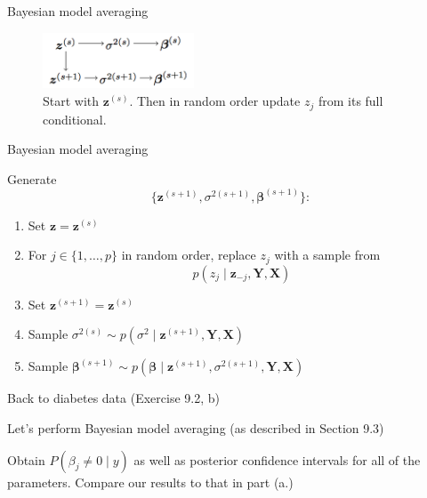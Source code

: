 \documentclass[ignorenonframetext,]{beamer}
\newcommand{\bz}   {\bm{z}}
\newcommand{\bY}   {\bm{Y}}
\newcommand{\bbeta}{\bm{\beta}}
\newcommand{\bX}   {\bm{X}}
\begin{document}

\begin{frame}{Bayesian model averaging}

\begin{figure}[htbp]
\begin{center}
\includegraphics[width=0.4\textwidth]{figures/gibbs-alg}
\caption{Start with $\bz^{(s)}.$ Then in random order update $z_j$ from its full conditional.}
\label{default}
\end{center}
\end{figure}

\end{frame}

\begin{frame}{Bayesian model averaging}

Generate \[\{ \bz^{(s+1)}, \sigma^{2(s+1)}, \bbeta^{(s+1)} \}:\]

\begin{enumerate}
\item Set $\bz = \bz^{(s)}$
\item For $j \in \{1,\ldots, p\}$ in random order, replace $z_j$ with a sample from 
$$p(z_j \mid \bz_{-j}, \bY, \bX)$$
\item Set $\bz^{(s+1)} = \bz^{(s)}$
\item Sample $\sigma^{2(s)} \sim p(\sigma^2 \mid \bz^{(s+1)}, \bY, \bX)$
\item Sample $\bbeta^{(s+1)} \sim p(\bbeta \mid \bz^{(s+1)}, \sigma^{2(s+1)}, \bY, \bX)$
\end{enumerate}

\end{frame}

\begin{frame}{Back to diabetes data (Exercise 9.2, b)}

Let's perform Bayesian model averaging (as described in Section 9.3)

Obtain \(P(\beta_j \neq 0 \mid y)\) as well as posterior confidence
intervals for all of the parameters. Compare our results to that in part
(a.)

\end{frame}
\end{document}
